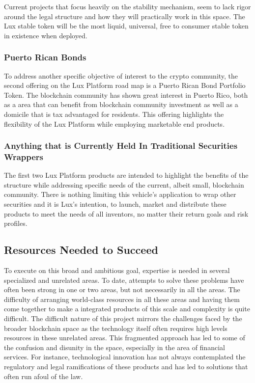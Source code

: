 \documentclass[11pt]{article}
\begin{document}
Current projects that focus heavily on the stability mechanism, seem to lack rigor around the legal structure and how they will practically work in this space. The Lux stable token will be the most liquid, universal, free to consumer stable token in existence when deployed.


\subsubsection{Puerto Rican Bonds}

To address another specific objective of interest to the crypto community, the second offering on the Lux Platform road map is a Puerto Rican Bond Portfolio Token. The blockchain community has shown great interest in Puerto Rico, both as a  area that can benefit from blockchain community investment as well as a domicile that is tax advantaged for residents. This offering highlights the flexibility of the Lux Platform while employing marketable end products.


\subsubsection{Anything that is Currently Held In Traditional Securities Wrappers}

The first two Lux Platform products are intended to highlight the benefits of the structure while addressing specific needs of the current, albeit small, blockchain community. There is nothing limiting this vehicle's application to wrap other securities and it is Lux's intention, to launch, market and distribute these products to meet the needs of all inventors, no matter their return goals and risk profiles.


\subsection{Resources Needed to Succeed}

To execute on this broad and ambitious goal, expertise is needed in several specialized and unrelated areas. To date, attempts to solve these problems have often been strong in one or two areas, but not necessarily in all the areas. The difficulty of arranging world-class resources in all these areas and having them come together to make a integrated products of this scale and complexity is quite difficult. The difficult nature of this project mirrors the challenges faced by the broader blockchain space as the technology itself often requires high levels resources in these unrelated areas. This fragmented approach has led to some of the confusion and disunity in the space, especially in the area of financial services. For instance, technological innovation has not always contemplated the regulatory and legal ramifications of these products and has led to solutions that often run afoul of the law.
\end{document}
